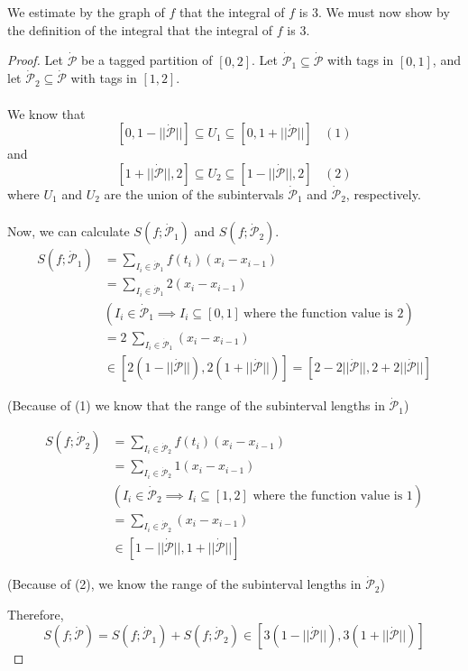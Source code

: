 \documentclass[12pt,letterpaper]{article}
\newcommand{\dotp}{\dot{\mathcal{P}}}
\theoremstyle{case}
\theoremstyle{definition}
\begin{document}
\begin{enumerate}
\begin{enumerate}
\begin{enumerate}
				\\\\We estimate by the graph of $f$ that the integral of $f$ is 3. We must now show by the definition of the integral that the integral of $f$ is 3.
				\begin{proof}
					Let $\dotp$ be a tagged partition of $[0,2]$. Let $\dotp_1 \subseteq \dotp$ with tags in $[0,1]$, and let $\dotp_2 \subseteq \dotp$ with tags in $[1,2]$. 
					\\\\We know that
					\[[0,1-||\dotp||] \subseteq U_1 \subseteq [0,1+||\dotp||]\ \ \ \ (1)\]
					and
					\[[1+||\dotp||,2] \subseteq U_2 \subseteq [1-||\dotp||,2]\ \ \ \ (2)\]
					where $U_1$ and $U_2$ are the union of the subintervals $\dotp_1$ and $\dotp_2$, respectively.
					\\\\Now, we can calculate $S(f;\dotp_1)$ and $S(f;\dotp_2)$.
					\begin{align*}
						S(f;\dotp_1) &= \sum_{I_i \in \dotp_1} f(t_i)(x_i-x_{i-1}) \\
						&= \sum_{I_i \in \dotp_1} 2(x_i-x_{i-1}) \\
						&(I_i \in \dotp_1 \implies I_i \subseteq [0,1]\ \text{where the function value is }2)\\
						&=2\ \sum_{I_i \in \dotp_1} (x_i-x_{i-1}) \\
						&\in [2(1-||\dotp||), 2(1+||\dotp||)] = [2-2||\dotp||, 2+2||\dotp||]
					\end{align*}
					\begin{center}
						(Because of (1) we know that the range of the subinterval lengths in $\dotp_1$)
					\end{center}
					\begin{align*}
						S(f;\dotp_2)&=\sum_{I_i \in \dotp_2} f(t_i)(x_i-x_{i-1}) \\
						&= \sum_{I_i \in \dotp_2} 1 (x_i-x_{i-1}) \\
						&(I_i \in \dotp_2 \implies I_i \subseteq [1,2]\text{ where the function value is }1) \\
						&= \sum_{I_i \in \dotp_2} (x_i-x_{i-1}) \\
						&\in [1-||\dotp||, 1+||\dotp||]
					\end{align*}
					\begin{center}
						(Because of (2), we know the range of the subinterval lengths in $\dotp_2$)
					\end{center}
					Therefore,
						\[S(f;\dotp)=S(f;\dotp_1)+S(f;\dotp_2) \in [3(1-||\dotp||),3(1+||\dotp||)]\]

\end{proof}
\end{enumerate}
\end{enumerate}
\end{enumerate}
\end{document}
